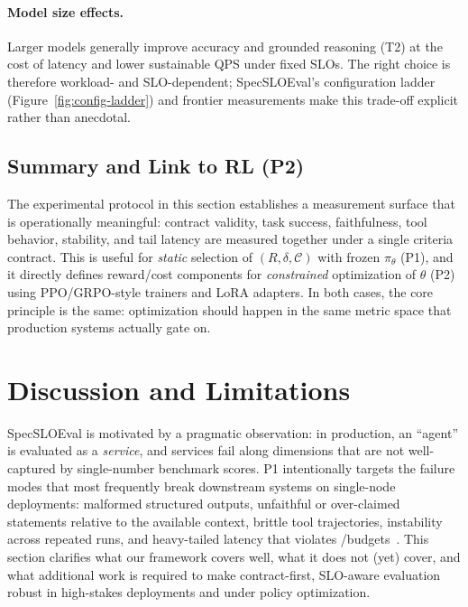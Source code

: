 \paragraph{Model size effects.}
Larger models generally improve accuracy and grounded reasoning (T2) at the cost of latency and lower sustainable QPS under fixed SLOs.
The right choice is therefore workload- and SLO-dependent; SpecSLOEval’s configuration ladder (Figure~\ref{fig:config-ladder}) and frontier measurements make this trade-off explicit rather than anecdotal.

\subsection{Summary and Link to RL (P2)}
\label{sec:results-summary}

The experimental protocol in this section establishes a measurement surface that is operationally meaningful:
contract validity, task success, faithfulness, tool behavior, stability, and tail latency are measured together under a single criteria contract.
This is useful for \emph{static} selection of $(R,\delta,\mathcal{C})$ with frozen $\pi_\theta$ (P1), and it directly defines reward/cost components for \emph{constrained} optimization of $\theta$ (P2) using PPO/GRPO-style trainers and LoRA adapters.
In both cases, the core principle is the same: optimization should happen in the same metric space that production systems actually gate on.

\section{Discussion and Limitations}
\label{sec:discussion}

SpecSLOEval is motivated by a pragmatic observation: in production, an ``agent'' is evaluated as a \emph{service}, and services fail along dimensions that are not well-captured by single-number benchmark scores.
P1 intentionally targets the failure modes that most frequently break downstream systems on single-node deployments: malformed structured outputs, unfaithful or over-claimed statements relative to the available context, brittle tool trajectories, instability across repeated runs, and heavy-tailed latency that violates \pninetyfive/\pninetynine budgets~\citep{dean2013tail}.
This section clarifies what our framework covers well, what it does not (yet) cover, and what additional work is required to make contract-first, SLO-aware evaluation robust in high-stakes deployments and under policy optimization.

